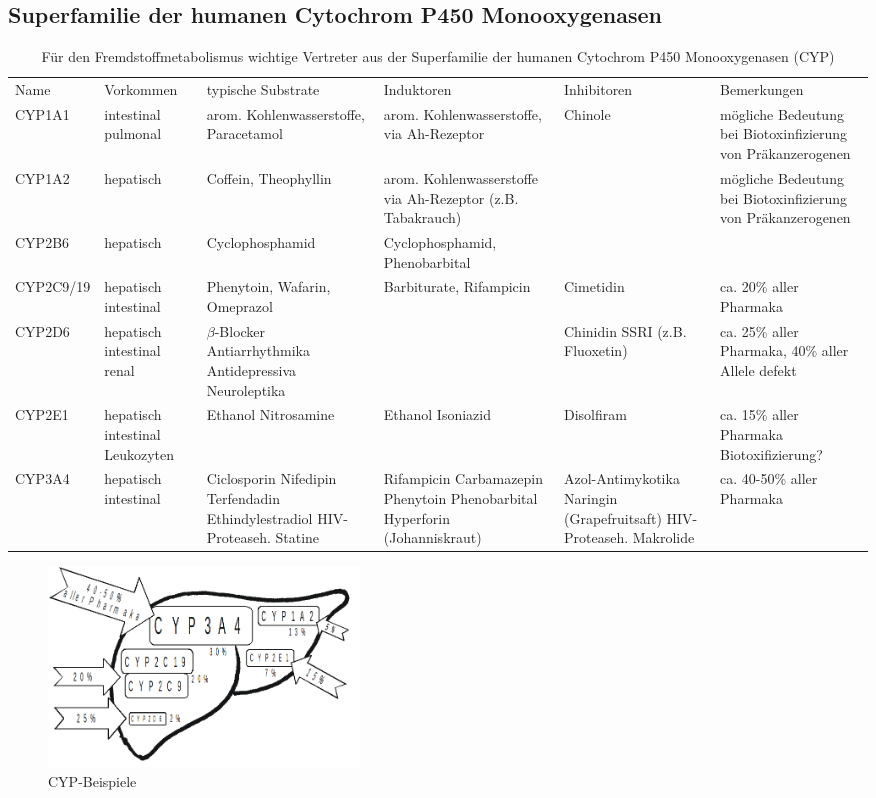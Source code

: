 \documentclass[10pt,a4paper]{report}
\begin{document}
\subsection{Superfamilie der humanen Cytochrom P450 Monooxygenasen} %
\label{sub:superfamilie_der_humanen_cytochrom_p450_monooxygenasen}


\begin{table}[h]
	\centering
	\begin{tabularx}{\textwidth}{lp{}p{3cm}Xp{}X}
		\toprule \addlinespace
		Name & Vorkommen & typische Substrate & Induktoren & Inhibitoren& Bemerkungen \\ \addlinespace
		\midrule
		CYP1A1&intestinal pulmonal&arom. Kohlenwasserstoffe, Paracetamol&arom. Kohlenwasserstoffe, via Ah-Rezeptor&Chinole&mögliche Bedeutung bei Biotoxinfizierung von Präkanzerogenen \\
		CYP1A2&hepatisch&Coffein, Theophyllin&arom. Kohlenwasserstoffe via Ah-Rezeptor (z.B. Tabakrauch)&&mögliche Bedeutung bei Biotoxinfizierung von Präkanzerogenen \\
		CYP2B6&hepatisch&Cyclophosphamid&Cyclophosphamid, Phenobarbital&&\\
		CYP2C9/19&hepatisch intestinal&Phenytoin, Wafarin, Omeprazol&Barbiturate, Rifampicin&Cimetidin&ca. 20\% aller Pharmaka\\
		CYP2D6&hepatisch intestinal renal& $\beta$-Blocker Antiarrhythmika Antidepressiva Neuroleptika&&Chinidin SSRI (z.B. Fluoxetin)& ca. 25\% aller Pharmaka, 40\% aller Allele defekt\\
		CYP2E1&hepatisch intestinal Leukozyten&Ethanol Nitrosamine&Ethanol Isoniazid& Disolfiram& ca. 15\% aller Pharmaka Biotoxifizierung?\\
		CYP3A4&hepatisch intestinal& Ciclosporin Nifedipin Terfendadin Ethindylestradiol HIV-Proteaseh. Statine&Rifampicin Carbamazepin Phenytoin Phenobarbital Hyperforin (Johanniskraut)& Azol-Antimykotika Naringin (Grapefruitsaft) HIV-Proteaseh. Makrolide& ca. 40-50\% aller Pharmaka\\   
		\bottomrule
	\end{tabularx}
	\caption{Für den Fremdstoffmetabolismus wichtige Vertreter aus der Superfamilie der humanen Cytochrom P450 Monooxygenasen (CYP)}
\label{tab:CYP450}
\end{table}

\begin{figure}[h]
	\centering 
	\includegraphics[width=0.4\textwidth]{Bilder/CYP.png} 
	\caption{CYP-Beispiele} 
	\label{fig:cyp-beispiele}
\end{figure}
\end{document}

